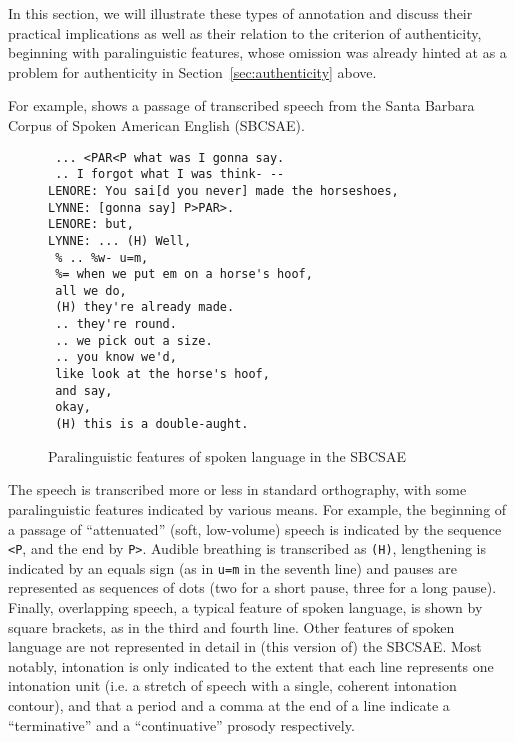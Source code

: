 In this section, we will illustrate these types of annotation  and discuss their practical implications as well as their relation to the criterion of authenticity,  beginning with paralinguistic  features, whose omission was already hinted at as a problem for authenticity in Section~\ref{sec:authenticity} above.

For example,  shows a passage of transcribed  speech  from the Santa Barbara Corpus of Spoken American  English  (SBCSAE).

\begin{figure}
\caption{Paralinguistic features of spoken language in the SBCSAE}
\label{fig:sbcsaeparalinguistic}
\hrulefill
\begin{verbatim}
 ... <PAR<P what was I gonna say.
 .. I forgot what I was think- --
LENORE: You sai[d you never] made the horseshoes,
LYNNE: [gonna say] P>PAR>.
LENORE: but,
LYNNE: ... (H) Well,
 % .. %w- u=m,
 %= when we put em on a horse's hoof,
 all we do,
 (H) they're already made.
 .. they're round.
 .. we pick out a size.
 .. you know we'd,
 like look at the horse's hoof,
 and say,
 okay,
 (H) this is a double-aught.
\end{verbatim}
\hrulefill
\end{figure}

The speech is transcribed  more or less in standard orthography, with some paralinguistic  features indicated by various means. For example, the beginning of a passage of ``attenuated'' (soft, low\hyp{}volume) speech is indicated by the sequence \texttt{<P}, and the end by \texttt{P>}. Audible breathing is transcribed as \texttt{(H)}, lengthening is indicated by an equals sign (as in \texttt{u=m} in the seventh line) and pauses are represented as sequences of dots (two for a short pause, three for a long pause). Finally, overlapping speech, a typical feature of spoken  language, is shown by square brackets, as in the third and fourth line. Other features of spoken language are not represented in detail in (this version of) the SBCSAE.  Most notably, intonation  is only indicated to the extent that each line represents one intonation unit (i.e. a stretch of speech with a single, coherent intonation contour), and that a period and a comma at the end of a line indicate a ``terminative'' and a ``continuative'' prosody respectively.

